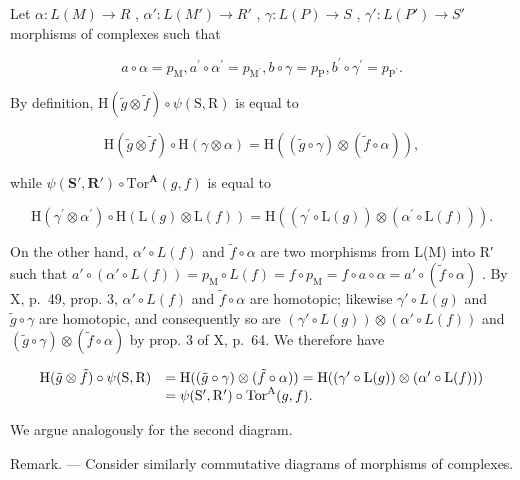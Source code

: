 Let \(\alpha: L(M) \to R\) , \(\alpha': L(M') \to R'\) , \(\gamma: L(P) \to S\) , \(\gamma': L(P') \to S'\) morphisms of complexes such that

\[
a \circ \alpha = p _ {\mathrm{M}}, a ^ {\prime} \circ \alpha^ {\prime} = p _ {\mathrm {M^ {\prime}}}, b \circ \gamma = p _ {\mathrm{P}}, b ^ {\prime} \circ \gamma^ {\prime} = p _ {\mathrm {P^ {\prime}}}.
\]

By definition, \(\mathrm{H}(\tilde{g}\otimes\tilde{f})\circ\psi(\mathrm{S},\mathrm{R})\) is equal to

\[
\mathrm{H} (\tilde {g} \otimes \tilde {f}) \circ \mathrm{H} (\gamma \otimes \alpha) = \mathrm{H} ((\tilde {g} \circ \gamma) \otimes (\tilde {f} \circ \alpha)),
\]

while \(\psi(\mathbf{S}',\mathbf{R}')\circ\mathrm{Tor}^{\mathbf{A}}(g,f)\) is equal to

\[
\mathrm{H} \left(\gamma^ {\prime} \otimes \alpha^ {\prime}\right) \circ \mathrm{H} \left(\mathrm{L} (g) \otimes \mathrm{L} (f)\right) = \mathrm{H} \left(\left(\gamma^ {\prime} \circ \mathrm{L} (g)\right) \otimes \left(\alpha^ {\prime} \circ \mathrm{L} (f)\right)\right).
\]

On the other hand, \(\alpha' \circ L(f)\) and \(\tilde{f} \circ \alpha\) are two morphisms from L(M) into R′ such that \(a' \circ (\alpha' \circ L(f)) = p_{\mathrm{M}} \circ L(f) = f \circ p_{\mathrm{M}} = f \circ a \circ \alpha = a' \circ (\tilde{f} \circ \alpha)\) . By X, p.~49, prop. 3, \(\alpha' \circ L(f)\) and \(\tilde{f} \circ \alpha\) are homotopic; likewise \(\gamma' \circ L(g)\) and \(\tilde{g} \circ \gamma\) are homotopic, and consequently so are \((\gamma' \circ L(g)) \otimes (\alpha' \circ L(f))\) and \((\tilde{g} \circ \gamma) \otimes (\tilde{f} \circ \alpha)\) by prop. 3 of X, p.~64. We therefore have

\[
\begin{array}{r l} \mathrm{H} (\tilde {g} \otimes \tilde {f}) \circ \psi (\mathrm{S}, \mathrm{R}) & = \mathrm{H} ((\tilde {g} \circ \gamma) \otimes (\tilde {f} \circ \alpha)) = \mathrm{H} ((\gamma^ {\prime} \circ \mathrm{L} (g)) \otimes (\alpha^ {\prime} \circ \mathrm{L} (f))) \\ & = \psi (\mathrm{S} ^ {\prime}, \mathrm{R} ^ {\prime}) \circ \mathrm{Tor} ^ {\mathrm{A}} (g, f). \end{array}
\]

We argue analogously for the second diagram.

Remark. --- Consider similarly commutative diagrams of morphisms of complexes.


